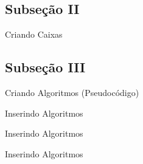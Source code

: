 \documentclass{libs/ufrb_format}
\begin{document}
\subsection{Subseção II}
\begin{frame}{Criando Caixas}

    \pause


    \pause

\end{frame}

\subsection{Subseção III}
\begin{frame}{Criando Algoritmos (Pseudocódigo)}
    \begin{algorithm}[H]
        \SetAlgoLined
        \LinesNumbered
         \caption{Algorithm Example}
    \end{algorithm}
\end{frame}


\begin{frame}{Inserindo Algoritmos}
    \lstset{language=Python}
    
\end{frame}

\begin{frame}{Inserindo Algoritmos}
    
\end{frame}

\begin{frame}{Inserindo Algoritmos}
    
\end{frame}
\end{document}
